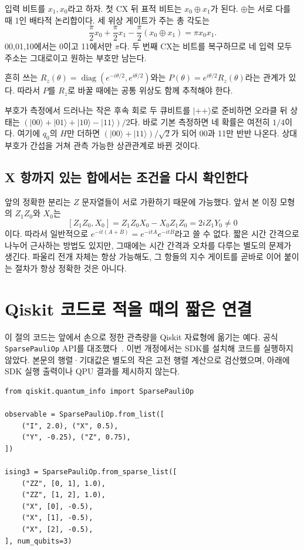 입력 비트를 \(x_1,x_0\)라고 하자. 첫 CX 뒤 표적 비트는
\(x_0\mathbin{\oplus}x_1\)가 된다. \(\oplus\)는 서로 다를 때 1인 배타적 논리합이다.
세 위상 게이트가 주는 총 각도는
\[
\frac\pi2x_0+\frac\pi2x_1-\frac\pi2(x_0\mathbin{\oplus}x_1)
=\pi x_0x_1.
\]
00,01,10에서는 0이고 11에서만 \(\pi\)다. 두 번째 CX는 비트를 복구하므로
네 입력 모두 주소는 그대로이고 원하는 부호만 남는다.

흔히 쓰는 \(R_z(\theta)=\operatorname{diag}(e^{-i\theta/2},e^{i\theta/2})\)와는
\(P(\theta)=e^{i\theta/2}R_z(\theta)\)라는 관계가 있다.
따라서 \(P\)를 \(R_z\)로 바꿀 때에는 공통 위상도 함께 추적해야 한다.

\begin{examplebox}{부호가 측정에서 드러나는 작은 후속 회로}
두 큐비트를 \(\lvert++\rangle\)로 준비하면 오라클 뒤 상태는
\((\lvert00\rangle+\lvert01\rangle+\lvert10\rangle-\lvert11\rangle)/2\)다.
바로 기본 측정하면 네 확률은 여전히 \(1/4\)이다.
여기에 \(q_0\)의 \(H\)만 더하면
\((\lvert00\rangle+\lvert11\rangle)/\sqrt2\)가 되어 00과 11만 반반 나온다.
상대 부호가 간섭을 거쳐 관측 가능한 상관관계로 바뀐 것이다.
\end{examplebox}

\subsection{X 항까지 있는 합에서는 조건을 다시 확인한다}

앞의 정확한 분리는 \(Z\) 문자열들이 서로 가환하기 때문에 가능했다.
앞서 본 이징 모형의 \(Z_1Z_0\)와 \(X_0\)는
\[
[Z_1Z_0,X_0]=Z_1Z_0X_0-X_0Z_1Z_0=2iZ_1Y_0\ne0
\]
이다. 따라서 일반적으로
\(e^{-it(A+B)}=e^{-itA}e^{-itB}\)라고 쓸 수 없다.
짧은 시간 간격으로 나누어 근사하는 방법도 있지만, 그때에는 시간 간격과 오차를
다루는 별도의 문제가 생긴다. 파울리 전개 자체는 항상 가능해도,
그 항들의 지수 게이트를 곧바로 이어 붙이는 절차가 항상 정확한 것은 아니다.

\section{Qiskit 코드로 적을 때의 짧은 연결}

이 절의 코드는 앞에서 손으로 정한 관측량을 Qiskit 자료형에 옮기는 예다.
공식 \texttt{SparsePauliOp} API를 대조했다~\cite{ibm-sparse}.
이번 개정에서는 SDK를 설치해 코드를 실행하지 않았다.
본문의 행렬·기대값은 별도의 작은 고전 행렬 계산으로 검산했으며,
아래에 SDK 실행 출력이나 QPU 결과를 제시하지 않는다.

\begin{verbatim}
from qiskit.quantum_info import SparsePauliOp

observable = SparsePauliOp.from_list([
    ("I", 2.0), ("X", 0.5),
    ("Y", -0.25), ("Z", 0.75),
])

ising3 = SparsePauliOp.from_sparse_list([
    ("ZZ", [0, 1], 1.0),
    ("ZZ", [1, 2], 1.0),
    ("X", [0], -0.5),
    ("X", [1], -0.5),
    ("X", [2], -0.5),
], num_qubits=3)
\end{verbatim}

